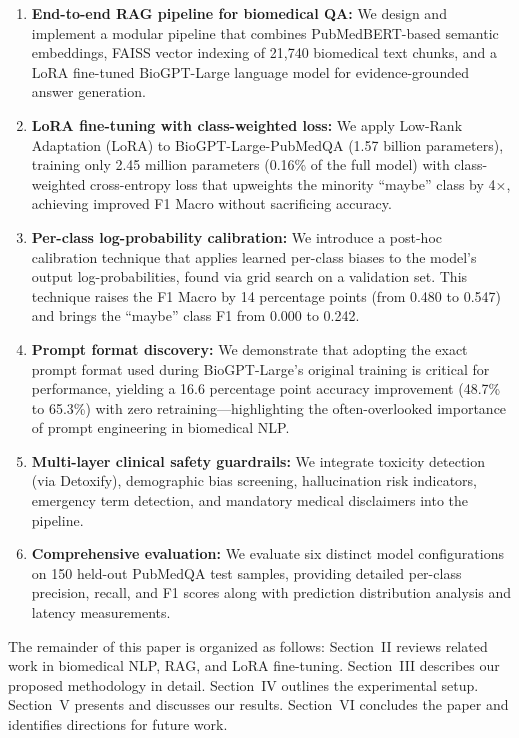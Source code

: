 \documentclass[conference]{IEEEtran}
\begin{document}
\begin{enumerate}[leftmargin=*]
    \item \textbf{End-to-end RAG pipeline for biomedical QA:} We design and implement a modular pipeline that combines PubMedBERT-based semantic embeddings, FAISS vector indexing of 21,740 biomedical text chunks, and a LoRA fine-tuned BioGPT-Large language model for evidence-grounded answer generation.

    \item \textbf{LoRA fine-tuning with class-weighted loss:} We apply Low-Rank Adaptation (LoRA) to BioGPT-Large-PubMedQA (1.57 billion parameters), training only 2.45 million parameters (0.16\% of the full model) with class-weighted cross-entropy loss that upweights the minority ``maybe'' class by 4$\times$, achieving improved F1 Macro without sacrificing accuracy.

    \item \textbf{Per-class log-probability calibration:} We introduce a post-hoc calibration technique that applies learned per-class biases to the model's output log-probabilities, found via grid search on a validation set. This technique raises the F1 Macro by 14 percentage points (from 0.480 to 0.547) and brings the ``maybe'' class F1 from 0.000 to 0.242.

    \item \textbf{Prompt format discovery:} We demonstrate that adopting the exact prompt format used during BioGPT-Large's original training is critical for performance, yielding a 16.6 percentage point accuracy improvement (48.7\% to 65.3\%) with zero retraining---highlighting the often-overlooked importance of prompt engineering in biomedical NLP.

    \item \textbf{Multi-layer clinical safety guardrails:} We integrate toxicity detection (via Detoxify), demographic bias screening, hallucination risk indicators, emergency term detection, and mandatory medical disclaimers into the pipeline.

    \item \textbf{Comprehensive evaluation:} We evaluate six distinct model configurations on 150 held-out PubMedQA test samples, providing detailed per-class precision, recall, and F1 scores along with prediction distribution analysis and latency measurements.
\end{enumerate}

The remainder of this paper is organized as follows: Section~II reviews related work in biomedical NLP, RAG, and LoRA fine-tuning. Section~III describes our proposed methodology in detail. Section~IV outlines the experimental setup. Section~V presents and discusses our results. Section~VI concludes the paper and identifies directions for future work.
\end{document}
